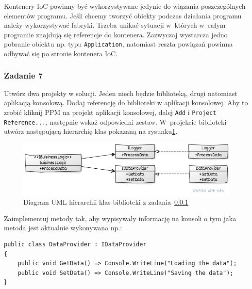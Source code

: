 Kontenery IoC powinny być wykorzystywane jedynie do wiązania poszczególnych elementów programu. Jeśli chcemy tworzyć obiekty podczas działania programu należy wykorzystywać fabryki. Trzeba unikać sytuacji w~których w~całym programie znajdują się referencje do kontenera. Zazwyczaj wystarcza jedno pobranie obiektu np. typu \texttt{Application}, natomiast reszta powiązań powinna odbywać się po stronie kontenera IoC.

\subsubsection{Zadanie 7}\label{lab1/ex/IoC}
Utwórz dwa projekty w solucji. Jeden niech będzie biblioteką, drugi natomiast aplikacją konsolową. Dodaj referencję do biblioteki w aplikacji konsolowej. Aby to zrobić kliknij PPM na projekt aplikacji konsolowej, dalej \texttt{Add} i \texttt{Project Reference...}, następnie wskaż odpowiedni zestaw. W~projekcie biblioteki utwórz następującą hierarchię klas pokazaną na rysunku\ref{lab1/fig/IoC}.
\begin{figure}[hbt!]
	\centering
	\includegraphics[width=0.8\linewidth]{images/ExerciseIocLib}
	\caption{Diagram UML hierarchii klas biblioteki z zadania~\ref{lab1/ex/IoC}}
	\label{lab1/fig/IoC}
\end{figure}

%

Zaimplementuj metody tak, aby wypisywały informację na konsoli o tym jaka metoda jest aktualnie wykonywana np.:
\begin{lstlisting}
public class DataProvider : IDataProvider
{
	public void GetData() => Console.WriteLine("Loading the data");
	public void SetData() => Console.WriteLine("Saving the data");
}
\end{lstlisting}

